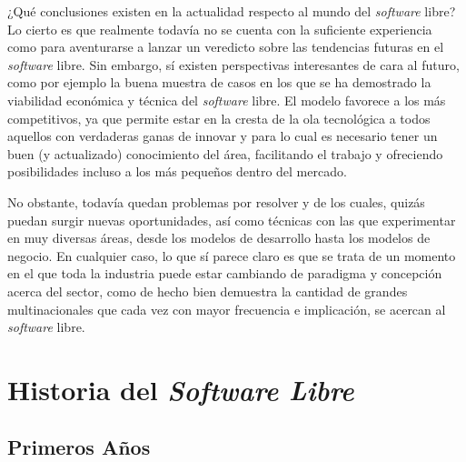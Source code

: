 ¿Qué conclusiones existen en la actualidad respecto al mundo del
\textit{software} libre? Lo cierto es que realmente todavía no se cuenta con la
suficiente experiencia como para aventurarse a lanzar un veredicto sobre las
tendencias futuras en el \textit{software} libre. Sin embargo, sí existen
perspectivas interesantes de cara al futuro, como por ejemplo la buena muestra
de casos en los que se ha demostrado la viabilidad económica y técnica del
\textit{software} libre. El modelo favorece a los más competitivos, ya que
permite estar en la cresta de la ola tecnológica a todos aquellos con verdaderas
ganas de innovar y para lo cual es necesario tener un buen (y actualizado)
conocimiento del área, facilitando el trabajo y ofreciendo posibilidades incluso
a los más pequeños dentro del mercado.

No obstante, todavía quedan problemas por resolver y de los cuales, quizás
puedan surgir nuevas oportunidades, así como técnicas con las que experimentar
en muy diversas áreas, desde los modelos de desarrollo hasta los modelos de
negocio. En cualquier caso, lo que sí parece claro es que se trata de un momento
en el que toda la industria puede estar cambiando de paradigma y concepción
acerca del sector, como de hecho bien demuestra la cantidad de grandes
multinacionales que cada vez con mayor frecuencia e implicación, se acercan al
\textit{software} libre.

\section{Historia del \textit{Software Libre}}

\subsection{Primeros Años}

